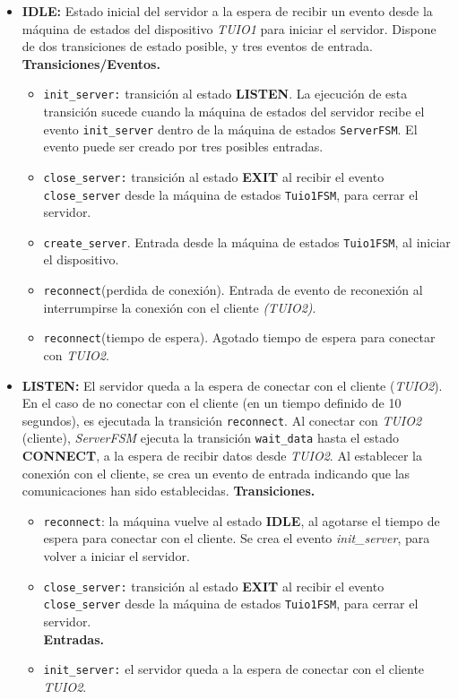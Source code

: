 \begin{itemize}
\item \textbf{IDLE:} Estado inicial del servidor a la espera de recibir un evento desde la máquina de estados del dispositivo \emph{TUIO1} para iniciar el servidor. Dispone de dos transiciones de estado posible, y tres eventos de entrada.\\
\textbf{Transiciones/Eventos.}
\begin{itemize}
\item \texttt{init\_server:} transición al estado \textbf{LISTEN}. La ejecución de esta transición sucede cuando la máquina de estados del servidor recibe el evento \texttt{init\_server} dentro de la máquina de estados \texttt{ServerFSM}. El evento puede ser creado por tres posibles entradas.
\item \texttt{close\_server:} transición al estado \textbf{EXIT} al recibir el evento \texttt{close\_server} desde la máquina de estados \texttt{Tuio1FSM}, para cerrar el servidor.\\
\item \texttt{create\_server}. Entrada desde la máquina de estados \texttt{Tuio1FSM}, al iniciar el dispositivo.
\item \texttt{reconnect}(perdida de conexión). Entrada de evento de reconexión al interrumpirse la conexión con el cliente \emph{(TUIO2)}.
\item \texttt{reconnect}(tiempo de espera). Agotado tiempo de espera para conectar con \emph{TUIO2}.
\end{itemize}


\item \textbf{LISTEN:} El servidor queda a la espera de conectar con el cliente (\emph{TUIO2}). En el caso de no conectar con el cliente (en un tiempo definido de 10 segundos), es ejecutada la transición \texttt{reconnect}. 
Al conectar con \emph{TUIO2} (cliente), \emph{ServerFSM} ejecuta la transición \texttt{wait\_data} hasta el estado \textbf{CONNECT}, a la espera de recibir datos desde \emph{TUIO2}. Al establecer la conexión con el cliente, se crea un evento de entrada indicando que las comunicaciones han sido establecidas.
\textbf{Transiciones.}
\begin{itemize}
\item \texttt{reconnect}: la máquina vuelve al estado \textbf{IDLE}, al agotarse el tiempo de espera para conectar con el cliente. Se crea el evento \emph{init\_server}, para volver a iniciar el servidor.\\
\item \texttt{close\_server:} transición al estado \textbf{EXIT} al recibir el evento \texttt{close\_server} desde la máquina de estados \texttt{Tuio1FSM}, para cerrar el servidor.\\
\textbf{Entradas.}
\item \texttt{init\_server:} el servidor queda a la espera de conectar con el cliente \emph{TUIO2}.
\end{itemize}



\end{itemize}
